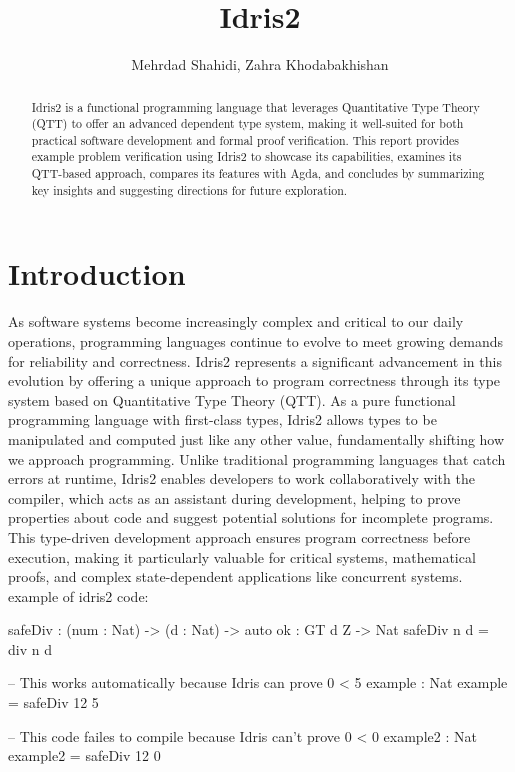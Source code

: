 \documentclass[]{rptuseminar}
\title{Idris2}
\author{Mehrdad Shahidi, Zahra Khodabakhishan
  \institute{Rheinland-Pfälzische Technische Universität Kaiserslautern-Landau, Department of Computer Science}}
\begin{document}

\maketitle


\begin{abstract}
Idris2 is a functional programming language that leverages Quantitative Type Theory (QTT) to offer an advanced dependent type system, making it well-suited for both practical software development and formal proof verification.
This report provides example problem verification using Idris2 to showcase its capabilities, examines its QTT-based approach, compares its features with Agda, and concludes by summarizing key insights and suggesting directions for future exploration.

\end{abstract}


\section{Introduction}
\label{sec:introduction}
As software systems become increasingly complex and critical to our daily operations, programming languages continue to evolve to meet growing demands for reliability and correctness.
Idris2 represents a significant advancement in this evolution by offering a unique approach to program correctness through its type system based on Quantitative Type Theory (QTT).
As a pure functional programming language with first-class types, Idris2 allows types to be manipulated and computed just like any other value, fundamentally shifting how we approach programming.
Unlike traditional programming languages that catch errors at runtime, Idris2 enables developers to work collaboratively with the compiler, which acts as an assistant during development, helping to prove properties about code and suggest potential solutions for incomplete programs.
This type-driven development approach ensures program correctness before execution, making it particularly valuable for critical systems, mathematical proofs, and complex state-dependent applications like concurrent systems.\cite{BradyYoutube2023}
example of idris2 code:
\begin{idris}
	safeDiv : (num : Nat) -> (d : Nat) -> {auto ok : GT d Z} -> Nat  
	safeDiv n d  = div n d  

	-- This works automatically because Idris can prove 0 < 5  
	example : Nat  
	example = safeDiv 12 5

	-- This code failes to compile because Idris can't prove 0 < 0
	example2 : Nat
	example2 = safeDiv 12 0


\end{idris}
\end{document}
